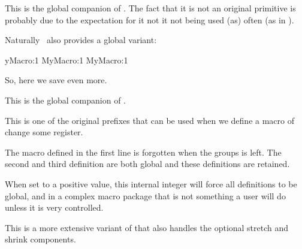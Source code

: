 \stopnewprimitive

\startnewprimitive[title={\prm {glet}}]

This is the global companion of . The fact that it is not an original
primitive is probably due to the expectation for it not it not being used (as)
often (as in \CONTEXT).

\stopnewprimitive

\startnewprimitive[title={\prm {gletcsname}}]

Naturally \LUAMETATEX\ also provides a global variant:

\starttyping
\expandafter\global\expandafter\let\csname MyMacro:1\endcsname\relax
\expandafter                  \glet\csname MyMacro:1\endcsname\relax
                               \gletcsname MyMacro:1\endcsname\relax
\stoptyping

So, here we save even more.

\stopnewprimitive

\startnewprimitive[title={\prm {glettonothing}}]

This is the global companion of .

\stopnewprimitive

\startoldprimitive[title={\prm {global}}]

This is one of the original prefixes that can be used when we define a macro of
change some register.

\starttyping
\bgroup
       \def\MyMacroA{a}
\global\def\MyMacroB{a}
      \gdef\MyMacroC{a}
\egroup
\stoptyping

The macro defined in the first line is forgotten when the groups is left. The
second and third definition are both global and these definitions are retained.

\stopoldprimitive

\startoldprimitive[title={\prm {globaldefs}}]

When set to a positive value, this internal integer will force all definitions to
be global, and in a complex macro package that is not something a user will do
unless it is very controlled.

\stopoldprimitive

\startoldprimitive[title={\prm {glueexpr}}]

This is a more extensive variant of  that also handles the optional
stretch and shrink components.

\stopoldprimitive

\startoldprimitive[title={\prm {glueshrink}}]


